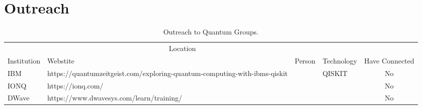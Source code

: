 \section{Outreach}

\begin{table} %
        \caption{Outreach to Quantum Groups.}
        \centering
        \begin{tabular}{l l l l c}
                \toprule
                \multicolumn{4}{c}{Location} \\
                \cmidrule(r){1-2}
                Institution & Webstite & Person & Technology & Have Connected \\
                \midrule
IBM   &	https://quantumzeitgeist.com/exploring-quantum-computing-with-ibms-qiskit & & QISKIT & No \\
IONQ  & https://ionq.com/                                                         & &        & No \\
DWave & https://www.dwavesys.com/learn/training/                                  & &        & No \\
                \bottomrule
        \end{tabular}
        \label{tab:distcounts}
\end{table}
